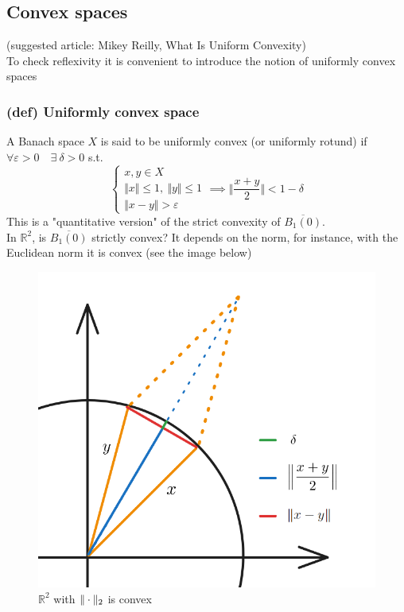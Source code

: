 \subsection{Convex spaces}
(suggested article: Mikey Reilly, What Is Uniform Convexity)\\
To check reflexivity it is convenient to introduce the notion of uniformly convex spaces
\subsubsection{(def) Uniformly convex space}
A Banach space $X$ is said to be uniformly convex (or uniformly rotund) if $\forall \varepsilon >0 \quad \exists \ \delta >0$ s.t.
$$\begin{cases}
    x,y\in X\\
    \Vert x\Vert \leq 1, \ \Vert y\Vert \leq 1\\
    \Vert x-y\Vert >\varepsilon
\end{cases}\implies \Big \Vert \frac{x+y}{2}\Big \Vert <1-\delta$$
This is a "quantitative version" of the strict convexity of $\overline{B_1(0)}$.\\
In $\mathbb R^2$, is $\overline{ B_1(0)}$ strictly convex? It depends on the norm, for instance, with the Euclidean norm it is convex (see the image below)
\begin{figure}[H]
        \centering
        \includegraphics[width=0.4\linewidth]{assets/convex_space_R2.png}
        \caption{$\mathbb R^2$ with $\Vert \cdot \Vert_2$ is convex}
        \label{fig:enter-label}
    \end{figure}
    
